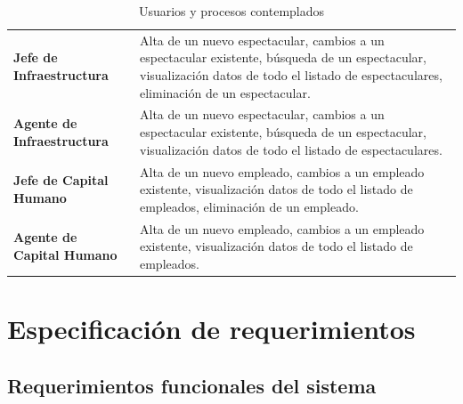 \documentclass[12pt]{article}
\begin{document}
\begin{longtable}[H]{m{4cm}m{8cm}}
    \textbf{Jefe de Infraestructura} & Alta de un nuevo espectacular, cambios a un espectacular existente, búsqueda de un espectacular, visualización datos de todo el listado de espectaculares, eliminación de un espectacular.\tabularnewline
    \textbf{Agente de Infraestructura} & Alta de un nuevo espectacular, cambios a un espectacular existente, búsqueda de un espectacular, visualización datos de todo el listado de espectaculares.\tabularnewline
    \textbf{Jefe de Capital Humano} & Alta de un nuevo empleado, cambios a un empleado existente, visualización datos de todo el listado de empleados, eliminación de un empleado.\tabularnewline
    \textbf{Agente de Capital Humano} & Alta de un nuevo empleado, cambios a un empleado existente, visualización datos de todo el listado de empleados.
    \caption{Usuarios y procesos contemplados}
\label{tbl:listaUP}
   \bottomrule
\end{longtable}

\section{Especificación de requerimientos}

\subsection{Requerimientos funcionales del sistema}
\end{document}
